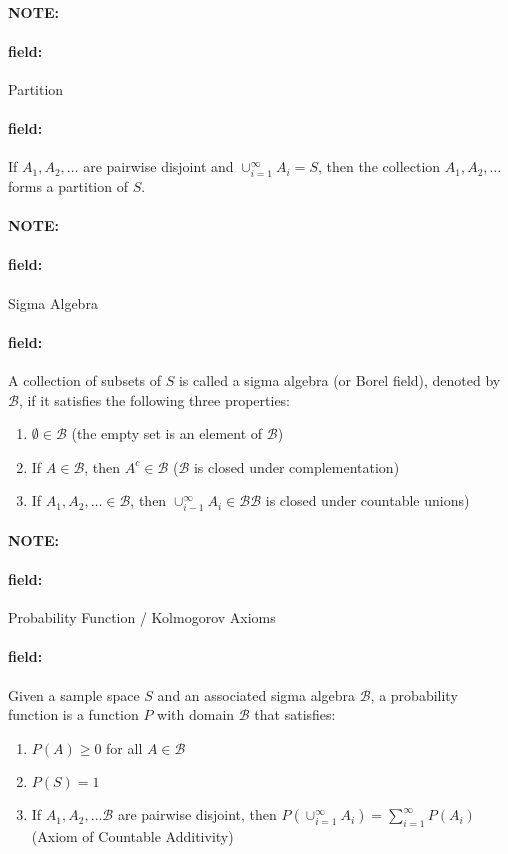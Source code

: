 \documentclass[12pt]{article}
\newenvironment{note}{\paragraph{NOTE:}}{}
\newenvironment{field}{\paragraph{field:}}{}
\begin{document}
\begin{note}
    \begin{field}
      Partition
    \end{field}
    \begin{field}
        If $A_1, A_2, \ldots$ are pairwise disjoint and $\cup_{i=1}^\infty A_i = S$, then the collection $A_1, A_2, \ldots$ forms a partition of $S$.
    \end{field}
\end{note}

\begin{note}
    \begin{field}
        Sigma Algebra
    \end{field}
    \begin{field}
        A collection of subsets of $S$ is called a sigma algebra (or Borel field), denoted by $\mathcal{B}$, if it satisfies the following three properties:
            \begin{enumerate}
              \item $\emptyset \in \mathcal{B}$ (the empty set is an element of $\mathcal{B}$)
              \item If $A \in \mathcal{B}$, then $A^c \in \mathcal{B}$ ($\mathcal{B}$ is closed under complementation)
              \item If $A_1, A_2, \ldots \in \mathcal{B}$, then $\cup_{i-1}^\infty A_i \in \mathcal{B} \mathcal{B}$ is closed under countable unions)
            \end{enumerate}
    \end{field}
\end{note}

\begin{note}
    \begin{field}
        Probability Function / Kolmogorov Axioms
    \end{field}
    \begin{field}
        Given a sample space $S$ and an associated sigma algebra $\mathcal{B}$, a probability function is a function $P$ with domain $\mathcal{B}$ that satisfies:
            \begin{enumerate}
              \item $P(A) \geq 0$ for all $A \in \mathcal{B}$
              \item $P(S) = 1$
              \item If $A_1, A_2, \ldots \mathcal{B}$ are pairwise disjoint, then $P(\cup_{i=1}^\infty A_i) = \sum_{i=1}^\infty P(A_i)$ (Axiom of Countable Additivity)
            \end{enumerate}
    \end{field}
\end{note}
\end{document}

